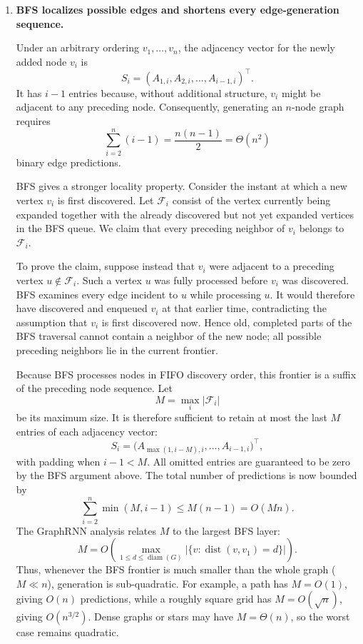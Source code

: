 \begin{solution}
\begin{enumerate}[label=\textbf{\arabic*.},leftmargin=*]
  \item \textbf{BFS localizes possible edges and shortens every edge-generation
    sequence.}

    Under an arbitrary ordering \(v_1,\ldots,v_n\), the adjacency vector for
    the newly added node \(v_i\) is
    \[
      S_i=(A_{1,i},A_{2,i},\ldots,A_{i-1,i})^\top.
    \]
    It has \(i-1\) entries because, without additional structure, \(v_i\)
    might be adjacent to any preceding node.  Consequently, generating an
    \(n\)-node graph requires
    \[
      \sum_{i=2}^{n}(i-1)
      =\frac{n(n-1)}{2}
      =\Theta(n^2)
    \]
    binary edge predictions.

    BFS gives a stronger locality property.  Consider the instant at which a
    new vertex \(v_i\) is first discovered.  Let \(\mathcal F_i\) consist of
    the vertex currently being expanded together with the already discovered
    but not yet expanded vertices in the BFS queue.  We claim that every
    preceding neighbor of \(v_i\) belongs to \(\mathcal F_i\).

    To prove the claim, suppose instead that \(v_i\) were adjacent to a
    preceding vertex \(u\notin\mathcal F_i\).  Such a vertex \(u\) was fully
    processed before \(v_i\) was discovered.  BFS examines every edge incident
    to \(u\) while processing \(u\).  It would therefore have discovered and
    enqueued \(v_i\) at that earlier time, contradicting the assumption that
    \(v_i\) is first discovered now.  Hence old, completed parts of the BFS
    traversal cannot contain a neighbor of the new node; all possible
    preceding neighbors lie in the current frontier.

    Because BFS processes nodes in FIFO discovery order, this frontier is a
    suffix of the preceding node sequence.  Let
    \[
      M=\max_i |\mathcal F_i|
    \]
    be its maximum size.  It is therefore sufficient to retain at most the
    last \(M\) entries of each adjacency vector:
    \[
      S_i=
      \bigl(
        A_{\max(1,i-M),i},\ldots,A_{i-1,i}
      \bigr)^\top,
    \]
    with padding when \(i-1<M\).  All omitted entries are guaranteed to be
    zero by the BFS argument above.  The total number of predictions is now
    bounded by
    \[
      \sum_{i=2}^{n}\min(M,i-1)
      \leq M(n-1)
      =O(Mn).
    \]
    The GraphRNN analysis relates \(M\) to the largest BFS layer:
    \[
      M
      =O\left(
        \max_{1\leq d\leq\operatorname{diam}(G)}
        \bigl|\{v:\operatorname{dist}(v,v_1)=d\}\bigr|
      \right).
    \]
    Thus, whenever the BFS frontier is much smaller than the whole graph
    (\(M\ll n\)), generation is sub-quadratic.  For example, a path has
    \(M=O(1)\), giving \(O(n)\) predictions, while a roughly square grid has
    \(M=O(\sqrt n)\), giving \(O(n^{3/2})\).  Dense graphs or stars may have
    \(M=\Theta(n)\), so the worst case remains quadratic.


\end{enumerate}
\end{solution}
